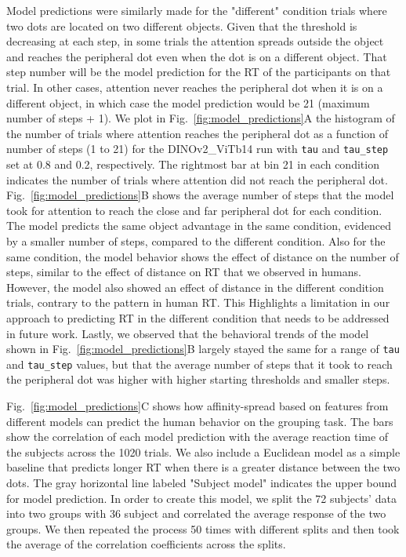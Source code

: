 \documentclass{article}
\begin{document}
Model predictions were similarly made for the "different" condition trials where two dots are located on two different objects. Given that the threshold is decreasing at each step, in some trials the attention spreads outside the object and reaches the peripheral dot even when the dot is on a different object. That step number will be the model prediction for the RT of the participants on that trial. In other cases, attention never reaches the peripheral dot when it is on a different object, in which case the model prediction would be 21 (maximum number of steps + 1). We plot in Fig.~\ref{fig:model_predictions}A the histogram of the number of trials where attention reaches the peripheral dot as a function of number of steps (1 to 21) for the DINOv2\_ViTb14 run with \texttt{tau} and \texttt{tau\_step} set at 0.8 and 0.2, respectively. The rightmost bar at bin 21 in each condition indicates the number of trials where attention did not reach the peripheral dot. Fig.~\ref{fig:model_predictions}B shows the average number of steps that the model took for attention to reach the close and far peripheral dot for each condition. The model predicts the same object advantage in the same condition, evidenced by a smaller number of steps, compared to the different condition. Also for the same condition, the model behavior shows the effect of distance on the number of steps, similar to the effect of distance on RT that we observed in humans. However, the model also showed an effect of distance in the different condition trials, contrary to the pattern in human RT. This Highlights a limitation in our approach to predicting RT in the different condition that needs to be addressed in future work. Lastly, we observed that the behavioral trends of the model shown in Fig.~\ref{fig:model_predictions}B largely stayed the same for a range of \texttt{tau} and \texttt{tau\_step} values, but that the average number of steps that it took to reach the peripheral dot was higher with higher starting thresholds and smaller steps.   

Fig.~\ref{fig:model_predictions}C shows how affinity-spread based on features from different models can predict the human behavior on the grouping task. The bars show the correlation of each model prediction with the average reaction time of the subjects across the 1020 trials. We also include a Euclidean model as a simple baseline that predicts longer RT when there is a greater distance between the two dots. The gray horizontal line labeled "Subject model" indicates the upper bound for model prediction. In order to create this model, we split the 72 subjects' data into two groups with 36 subject and correlated the average response of the two groups. We then repeated the process 50 times with different splits and then took the average of the correlation coefficients across the splits.  
\end{document}
